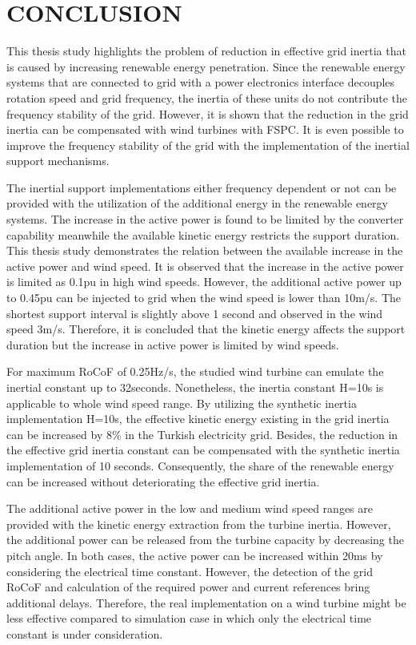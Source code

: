\chapter{CONCLUSION}
\label{chp:7}
This thesis study highlights the problem of reduction in effective grid inertia that is caused by increasing renewable energy penetration. Since the renewable energy systems that are connected to grid with a power electronics interface decouples rotation speed and grid frequency, the inertia of these units do not contribute the frequency stability of the grid. However, it is shown that the reduction in the grid inertia can be compensated with wind turbines with FSPC. It is even possible to improve the frequency stability of the grid with the implementation of the inertial support mechanisms.\par
The inertial support implementations either frequency dependent or not can be provided with the utilization of the additional energy in the renewable energy systems. The increase in the active power is found to be limited by the converter capability meanwhile the available kinetic energy restricts the support duration. This thesis study demonstrates the relation between the available increase in the active power and wind speed. It is observed that the increase in the active power is limited as 0.1pu in high wind speeds. However, the additional active power up to 0.45pu can be injected to grid when the wind speed is lower than 10m/s. The shortest support interval is slightly above 1 second and observed in the wind speed 3m/s. Therefore, it is concluded that the kinetic energy affects the support duration but the increase in active power is limited by wind speeds. \par
For maximum RoCoF of 0.25Hz/s, the studied wind turbine can emulate the inertial constant up to 32seconds. Nonetheless, the inertia constant H=10s is applicable to whole wind speed range. By utilizing the synthetic inertia implementation H=10s, the effective kinetic energy existing in the grid inertia can be increased by 8\% in the Turkish electricity grid. Besides, the reduction in the effective grid inertia constant can be compensated with the synthetic inertia implementation of 10 seconds. Consequently, the share of the renewable energy can be increased without deteriorating the effective grid inertia.\par
The additional active power in the low and medium wind speed ranges are provided with the kinetic energy extraction from the turbine inertia. However, the additional power can be released from the turbine capacity by decreasing the pitch angle. In both cases, the active power can be increased within 20ms by considering the electrical time constant. However, the detection of the grid RoCoF and calculation of the required power and current references bring additional delays. Therefore, the real implementation on a wind turbine might be less effective compared to simulation case in which only the electrical time constant is under consideration.\par
